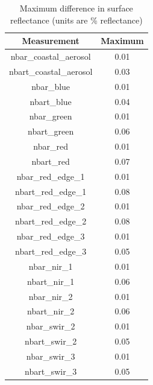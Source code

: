 \documentclass[a4paper]{article}
\begin{document}
    \begin{table}[ht!]
      \caption{Maximum difference in surface reflectance (units are \% reflectance)}\label{table:2}
      \centering
      \begin{tabular}{cc} \midrule
        \textbf{Measurement} & \textbf{Maximum} \\ \midrule
        nbar\_coastal\_aerosol & 0.01 \\
        nbart\_coastal\_aerosol & 0.03 \\
        nbar\_blue & 0.01 \\
        nbart\_blue & 0.04 \\
        nbar\_green & 0.01 \\
        nbart\_green & 0.06 \\
        nbar\_red & 0.01 \\
        nbart\_red & 0.07 \\
        nbar\_red\_edge\_1 & 0.01 \\
        nbart\_red\_edge\_1 & 0.08 \\
        nbar\_red\_edge\_2 & 0.01 \\
        nbart\_red\_edge\_2 & 0.08 \\
        nbar\_red\_edge\_3 & 0.01 \\
        nbart\_red\_edge\_3 & 0.05 \\
        nbar\_nir\_1 & 0.01 \\
        nbart\_nir\_1 & 0.06 \\
        nbar\_nir\_2 & 0.01 \\
        nbart\_nir\_2 & 0.06 \\
        nbar\_swir\_2 & 0.01 \\
        nbart\_swir\_2 & 0.05 \\
        nbar\_swir\_3 & 0.01 \\
        nbart\_swir\_3 & 0.05 \\ \midrule
      \end{tabular}
    \end{table}

  \newpage
\end{document}
